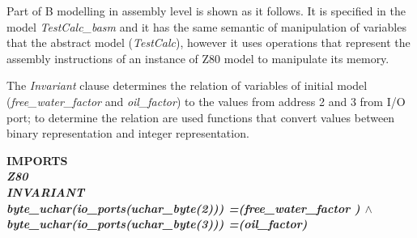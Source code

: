 \documentclass[11pt]{article} %
\begin{document}
Part of B modelling in assembly level is shown as it follows. It is specified in
the model \textit{TestCalc\_basm} and it has the same semantic of manipulation of
variables that the abstract model (\textit{TestCalc}), however it uses operations
that represent the assembly instructions of an instance of Z80 model to
manipulate its memory.



The \textit{Invariant} clause  determines the relation of variables of initial model (\textit{free\_water\_factor}
and \textit{oil\_factor}) to the values from address 2 and 3 from I/O port; to determine the relation are used functions
that convert values between binary representation and integer representation.

\small{
\begin{sloppypar}
\hspace*{-0.30in}\bf IMPORTS\\
\hspace*{0.20in}\it Z80\\
\bf INVARIANT\\
\hspace*{0.20in}\it byte\_uchar\rm (\it io\_ports\rm (\it uchar\_byte\rm (\rm 2\rm )\rm )\rm ) \rm
=\hspace*{0.10in}\rm (\it free\_water\_factor \rm )  $\land$\\
\hspace*{0.20in}\it byte\_uchar\rm (\it io\_ports\rm (\it uchar\_byte\rm (\rm 3\rm )\rm )\rm ) \rm
=\hspace*{0.10in}\rm (\it oil\_factor\rm )
\end{sloppypar}
}
\end{document}
